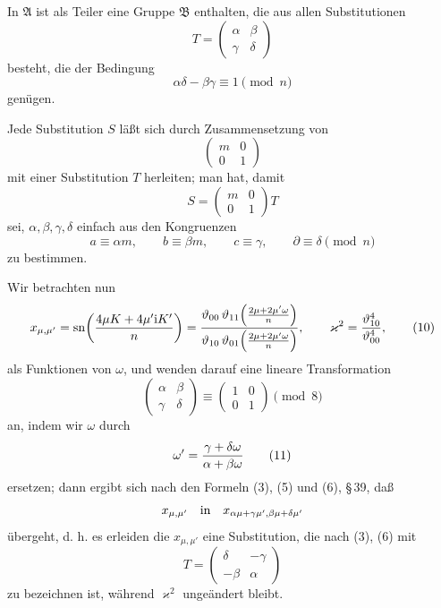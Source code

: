 \documentclass[11pt]{article}
\providecommand{\sn}{\operatorname{sn}}
\providecommand{\ii}{\mathrm{i}}
\begin{document}
In $\mathfrak A$ ist als Teiler eine Gruppe $\mathfrak B$ enthalten, die aus allen Substitutionen
\begin{equation}
 T=\begin{pmatrix}\alpha&\beta\\ \gamma&\delta\end{pmatrix}
\tag{8}
\end{equation}
besteht, die der Bedingung
\begin{equation}
 \alpha\delta-\beta\gamma\equiv1\pmod n
\tag{9}
\end{equation}
genügen.

Jede Substitution $S$ läßt sich durch Zusammensetzung von
\[
 \begin{pmatrix}m&0\\0&1\end{pmatrix}
\]
mit einer Substitution $T$ herleiten; man hat, damit
\[
 S=\begin{pmatrix}m&0\\0&1\end{pmatrix}T
\]
sei, $\alpha,\beta,\gamma,\delta$ einfach aus den Kongruenzen
\[
 a\equiv\alpha m,
 \qquad b\equiv\beta m,
 \qquad c\equiv\gamma,
 \qquad \partial\equiv\delta\pmod n
\]
zu bestimmen.

Wir betrachten nun
\begin{equation}
 x_{\mu,\mu'}=
 \sn\!\left({4\mu K+4\mu'\ii K'\over n}\right)
 ={\vartheta_{00}\,\vartheta_{11}\!\left({2\mu+2\mu'\omega\over n}\right)
 \over
 \vartheta_{10}\,\vartheta_{01}\!\left({2\mu+2\mu'\omega\over n}\right)},
 \qquad
 \varkappa^2={\vartheta_{10}^{4}\over\vartheta_{00}^{4}},
\tag{10}
\end{equation}
als Funktionen von $\omega$, und wenden darauf eine lineare Transformation
\[
 \begin{pmatrix}\alpha&\beta\\ \gamma&\delta\end{pmatrix}
 \equiv
 \begin{pmatrix}1&0\\0&1\end{pmatrix}\pmod 8
\]
an, indem wir $\omega$ durch
\begin{equation}
 \omega'={\gamma+\delta\omega\over\alpha+\beta\omega}
\tag{11}
\end{equation}
ersetzen; dann ergibt sich nach den Formeln (3), (5) und (6), \S\,39, daß
\[
 x_{\mu,\mu'}\quad\hbox{in}\quad x_{\alpha\mu+\gamma\mu',\beta\mu+\delta\mu'}
\]
übergeht, d. h. es erleiden die $x_{\mu,\mu'}$ eine Substitution, die nach (3), (6) mit
\[
 T=\begin{pmatrix}\delta&-\gamma\\ -\beta&\alpha\end{pmatrix}
\]
zu bezeichnen ist, während $\varkappa^2$ ungeändert bleibt.
\end{document}
